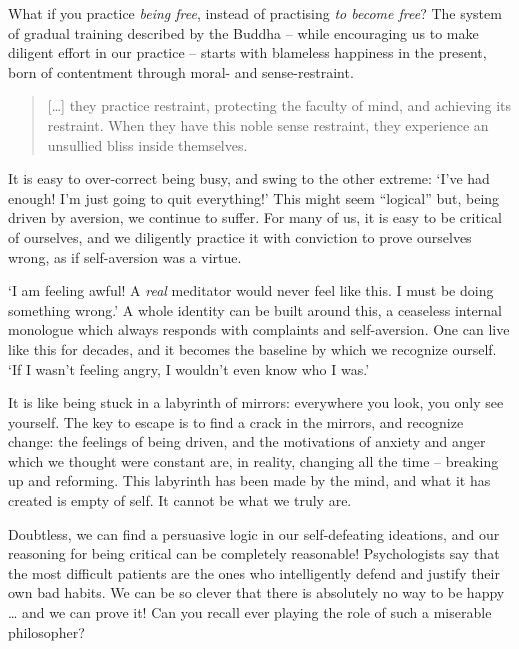 \clearpage
\normalpagelayout

What if you practice \emph{being free}, instead of practising \emph{to
become free}? The system of gradual training described by the Buddha --
while encouraging us to make diligent effort in our practice -- starts
with blameless happiness in the present, born of contentment through
moral- and sense-restraint.

\begin{quote}
{[}\ldots{]} they practice restraint, protecting the faculty of mind,
and achieving its restraint. When they have this noble sense restraint,
they experience an unsullied bliss inside themselves.

\bigskip

\end{quote}


It is easy to over-correct being busy, and swing to the other extreme:
`I've had enough! I'm just going to quit everything!' This might seem
``logical'' but, being driven by aversion, we continue to suffer. For
many of us, it is easy to be critical of ourselves, and we diligently
practice it with conviction to prove ourselves wrong, as if
self-aversion was a virtue.

`I am feeling awful! A \emph{real} meditator would never feel like this.
I must be doing something wrong.' A whole identity can be built around
this, a ceaseless internal monologue which always responds with
complaints and self-aversion. One can live like this for decades, and it
becomes the baseline by which we recognize ourself. `If I wasn't feeling
angry, I wouldn't even know who I was.'

It is like being stuck in a labyrinth of mirrors: everywhere you look,
you only see yourself. The key to escape is to find a crack in the
mirrors, and recognize change: the feelings of being driven, and the
motivations of anxiety and anger which we thought were constant are, in
reality, changing all the time -- breaking up and reforming. This
labyrinth has been made by the mind, and what it has created is empty of
self. It cannot be what we truly are.

Doubtless, we can find a persuasive logic in our self-defeating
ideations, and our reasoning for being critical can be completely
reasonable! Psychologists say that the most difficult patients are the
ones who intelligently defend and justify their own bad habits. We can
be so clever that there is absolutely no way to be happy \ldots{} and we
can prove it! Can you recall ever playing the role of such a miserable
philosopher?

